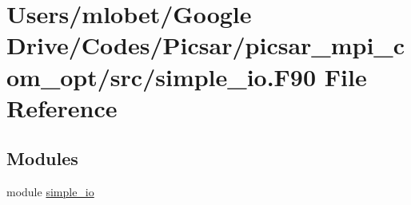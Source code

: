 \hypertarget{simple__io_8_f90}{}\section{Users/mlobet/\+Google Drive/\+Codes/\+Picsar/picsar\+\_\+mpi\+\_\+com\+\_\+opt/src/simple\+\_\+io.F90 File Reference}
\label{simple__io_8_f90}
\subsection*{Modules}
\begin{DoxyCompactItemize}
\item 
module \hyperlink{namespacesimple__io}{simple\+\_\+io}
\end{DoxyCompactItemize}
